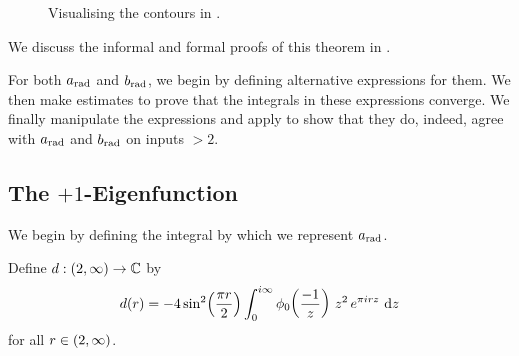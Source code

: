 \begin{figure}
    \vspace{-0.7em}
    \centering
    \caption{Visualising the contours in .}  
\end{figure}

We discuss the informal and formal proofs of this theorem in .

For both $a_{\operatorname{rad}}$ and $b_{\operatorname{rad}}$, we begin by defining alternative expressions for them. We then make estimates to prove that the integrals in these expressions converge. We finally manipulate the expressions and apply  to show that they do, indeed, agree with $a_{\operatorname{rad}}$ and $b_{\operatorname{rad}}$ on inputs $> 2$.

\subsection{The $+1$-Eigenfunction}

We begin by defining the integral by which we represent $a_{\operatorname{rad}}$.

\begin{boxdefinition}
    Define $d : \left( 2, \infty \right) \to \mathbb{C}$ by
    \begin{align*}
        d\!\left( r \right) = -4 \sin^2\!\left( \frac{\pi r}{2} \right) \int_{0}^{i\infty} \phi_0\!\left( \frac{-1}{z} \right) \, z^2 \, e^{\pi i r z} \, \operatorname{d}\!{z}
    \end{align*}
    for all $r \in \left( 2, \infty \right)$.
\end{boxdefinition}

